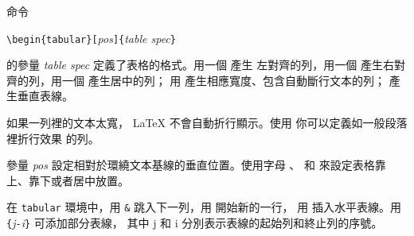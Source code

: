 命令
\begin{lscommand}
\verb|\begin{tabular}[|\emph{pos}\verb|]{|\emph{table spec}\verb|}|
\end{lscommand}
\noindent 的參量 \emph{table
spec} 定義了表格的格式。用一個  產生
左對齊的列，用一個  產生右對齊的列，用一個  產生居中的列；
用  產生相應寬度、包含自動斷行文本的列；
\mfr{|} 產生垂直表線。


如果一列裡的文本太寬，
\LaTeX{} 不會自動折行顯示。使用  你可以定義如一般段落裡折行效果
的列。

參量 \emph{pos} 設定相對於環繞文本基線的垂直位置。使用字母 、
 和  來設定表格靠上、靠下或者居中放置。

在 \texttt{tabular} 環境中，用 \verb|&| 跳入下一列，用 \ci{\bs} 開始新的一行，
用  插入水平表線。用 \texttt{\{}\emph{j}\texttt{-}\emph{i}\texttt{\}} 可添加部分表線，
其中 j 和 i 分別表示表線的起始列和終止列的序號。


